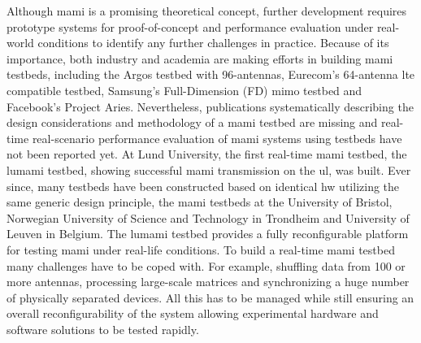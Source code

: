 \documentclass[journal]{IEEEtran}
\begin{document}
Although \gls{mami} is a promising theoretical concept, further development requires prototype systems for proof-of-concept and performance evaluation under real-world conditions to identify any further challenges in practice.
Because of its importance, both industry and academia are making efforts in building \gls{mami} testbeds, including the Argos testbed with 96-antennas\cite{Argos1}, Eurecom's 64-antenna \gls{lte} compatible testbed, Samsung's Full-Dimension (FD) \gls{mimo} testbed and Facebook's Project Aries. 
Nevertheless, publications systematically describing the design considerations and methodology of a \gls{mami} testbed are missing and real-time real-scenario performance evaluation of \gls{mami} systems using testbeds have not been reported yet. 
At Lund University, the first real-time \gls{mami} testbed, the \gls{lumami} testbed, showing successful \gls{mami} transmission on the \gls{ul}, was built\cite{Vieira2014a}.
Ever since, many testbeds have been constructed based on identical \gls{hw} utilizing the same generic design principle, \eg the \gls{mami} testbeds at the University of Bristol\cite{Bristol1}, Norwegian University of Science and Technology in Trondheim and University of Leuven in Belgium. 
%
%
%
%
The \gls{lumami} testbed provides a fully reconfigurable platform for testing \gls{mami} under real-life conditions.
To build a real-time \gls{mami} testbed many challenges have to be coped with.
For example, shuffling data from 100 or more antennas, processing large-scale matrices and synchronizing a huge number of physically separated devices.
All this has to be managed while still ensuring an overall reconfigurability of the system allowing experimental hardware and software solutions to be tested rapidly.
\end{document}
